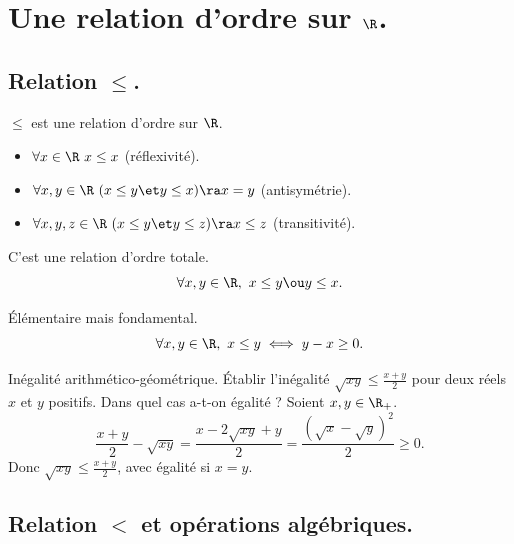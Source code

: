 \documentclass[11pt]{article}
\begin{document}


\thispagestyle{fancy}

\section{Une relation d'ordre sur \texorpdfstring{$\R$}{Lg}.}
\subsection{Relation \texorpdfstring{$\leq$}{Lg}.}

\begin{rappel}{$\leq$ est une relation d'ordre sur $\R$.}{}
    \begin{itemize}
        \item $\forall x\in\R~x\leq x$ (réflexivité).
        \item $\forall x,y\in\R~(x\leq y \et y\leq x)\ra x=y$ (antisymétrie).
        \item $\forall x,y,z \in \R~(x\leq y \et y \leq z) \ra x \leq z$ (transitivité).
    \end{itemize}
\end{rappel}

\begin{rappel}{C'est une relation d'ordre totale.}{}
    \begin{equation*}
        \forall x,y \in\R,~ x\leq y \ou y\leq x. 
    \end{equation*}
\end{rappel}

\begin{rappel}{Élémentaire mais fondamental.}{}
    \begin{equation*}
        \forall x,y\in\R,~x\leq y \iff y - x \geq 0.
    \end{equation*}
\end{rappel}

\begin{ex}{Inégalité arithmético-géométrique.}{}
    Établir l'inégalité $\sqrt{xy}\leq\frac{x+y}{2}$ pour deux réels $x$ et $y$ positifs. Dans quel cas a-t-on égalité ?
    \tcblower
    Soient $x,y\in\R_+$.
    \begin{equation*}
        \frac{x+y}{2}-\sqrt{xy}=\frac{x-2\sqrt{xy}+y}{2}=\frac{(\sqrt{x}-\sqrt{y})^2}{2}\geq 0.
    \end{equation*}
    Donc $\sqrt{xy}\leq\frac{x+y}{2}$, avec égalité si $x=y$.
\end{ex}

\subsection{Relation \texorpdfstring{$<$}{Lg} et opérations algébriques.}
\end{document}
